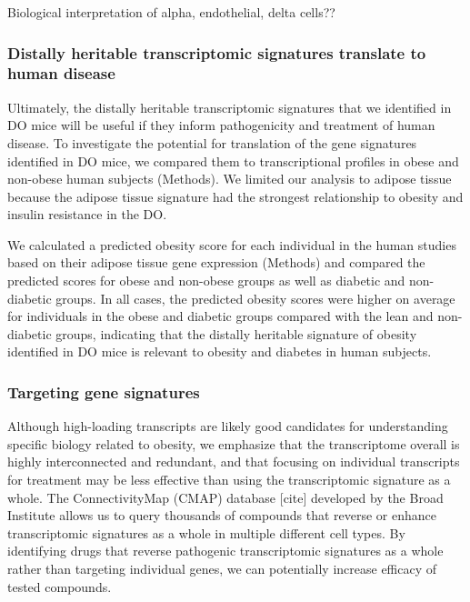 \documentclass[
]{article}
\begin{document}
Biological interpretation of alpha, endothelial, delta cells??

\subsubsection{Distally heritable transcriptomic signatures translate to
human
disease}\label{distally-heritable-transcriptomic-signatures-translate-to-human-disease}

Ultimately, the distally heritable transcriptomic signatures that we
identified in DO mice will be useful if they inform pathogenicity and
treatment of human disease. To investigate the potential for translation
of the gene signatures identified in DO mice, we compared them to
transcriptional profiles in obese and non-obese human subjects
(Methods). We limited our analysis to adipose tissue because the adipose
tissue signature had the strongest relationship to obesity and insulin
resistance in the DO.

We calculated a predicted obesity score for each individual in the human
studies based on their adipose tissue gene expression (Methods) and
compared the predicted scores for obese and non-obese groups as well as
diabetic and non-diabetic groups. In all cases, the predicted obesity
scores were higher on average for individuals in the obese and diabetic
groups compared with the lean and non-diabetic groups, indicating that
the distally heritable signature of obesity identified in DO mice is
relevant to obesity and diabetes in human subjects.

\subsubsection{Targeting gene
signatures}\label{targeting-gene-signatures}

Although high-loading transcripts are likely good candidates for
understanding specific biology related to obesity, we emphasize that the
transcriptome overall is highly interconnected and redundant, and that
focusing on individual transcripts for treatment may be less effective
than using the transcriptomic signature as a whole. The ConnectivityMap
(CMAP) database {[}cite{]} developed by the Broad Institute allows us to
query thousands of compounds that reverse or enhance transcriptomic
signatures as a whole in multiple different cell types. By identifying
drugs that reverse pathogenic transcriptomic signatures as a whole
rather than targeting individual genes, we can potentially increase
efficacy of tested compounds.
\end{document}

